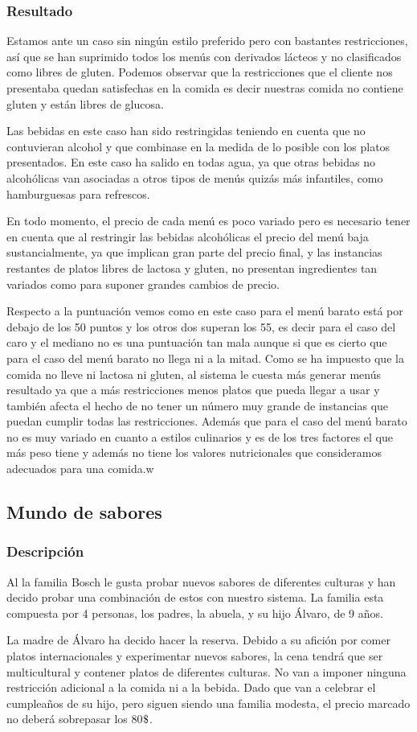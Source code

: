 \documentclass{article}
\newcommand{\dollar}{\mbox{\textdollar}}
\begin{document}
\subsubsection{Resultado}
Estamos ante un caso sin ningún estilo preferido pero con bastantes restricciones, así que se han suprimido todos los menús con derivados lácteos y no clasificados como libres de gluten. Podemos observar que la restricciones que el cliente nos presentaba quedan satisfechas en la comida es decir nuestras comida no contiene gluten y están libres de glucosa.
\par
Las bebidas en este caso han sido restringidas teniendo en cuenta que no contuvieran alcohol y que combinase en la medida de lo posible con los platos presentados. En este caso ha salido en todas agua, ya que otras bebidas no alcohólicas van asociadas a otros tipos de menús quizás más infantiles, como hamburguesas para refrescos.
\par
En todo momento, el precio de cada menú es poco variado pero es necesario tener en cuenta que al restringir las bebidas alcohólicas el precio del menú baja sustancialmente, ya que implican gran parte del precio final, y las instancias restantes de platos libres de lactosa y gluten, no presentan ingredientes tan variados como para suponer grandes cambios de precio.
\par
Respecto a la puntuación vemos como en este caso para el menú barato está por debajo de los 50 puntos y los otros dos superan los 55, es decir para el caso del caro y el mediano no es una puntuación tan mala aunque si que es cierto que para el caso del menú barato no llega ni a la mitad. Como se ha impuesto que la comida no lleve ni lactosa ni gluten, al sistema le cuesta más generar menús resultado ya que a más restricciones menos platos que pueda llegar a usar y también afecta el hecho de no tener un número muy grande de instancias que puedan cumplir todas las restricciones. Además que para el caso del menú barato no es muy variado en cuanto a estilos culinarios y es de los tres factores el que más peso tiene y además no tiene los valores nutricionales que consideramos adecuados para una comida.w

\subsection{Mundo de sabores}
\subsubsection{Descripción}
Al la familia Bosch le gusta probar nuevos sabores de diferentes culturas y han decido probar una combinación de estos con nuestro sistema. La familia esta compuesta por 4 personas, los padres, la abuela, y su hijo Álvaro, de 9 años.
\par
La madre de Álvaro ha decido hacer la reserva. Debido a su afición por comer platos internacionales y experimentar nuevos sabores, la cena tendrá que ser multicultural y contener platos de diferentes culturas. No van a imponer ninguna restricción adicional a la comida ni a la bebida. Dado que van a celebrar el cumpleaños de su hijo, pero siguen siendo una familia modesta, el precio marcado no deberá sobrepasar los 80$\dollar$.
\end{document}
